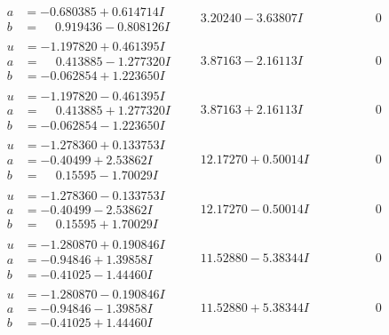 \documentclass[1p]{elsarticle_modified}
\theoremstyle{definition}
\begin{document}
$$\begin{array}{c|c|c}
\begin{aligned}
a &= -0.680385 + 0.614714 I \\
b &= \phantom{-}0.919436 - 0.808126 I\end{aligned}
 & \phantom{-}3.20240 - 3.63807 I & \phantom{-0.000000 } 0 \\ \hline\begin{aligned}
u &= -1.197820 + 0.461395 I \\
a &= \phantom{-}0.413885 - 1.277320 I \\
b &= -0.062854 + 1.223650 I\end{aligned}
 & \phantom{-}3.87163 - 2.16113 I & \phantom{-0.000000 } 0 \\ \hline\begin{aligned}
u &= -1.197820 - 0.461395 I \\
a &= \phantom{-}0.413885 + 1.277320 I \\
b &= -0.062854 - 1.223650 I\end{aligned}
 & \phantom{-}3.87163 + 2.16113 I & \phantom{-0.000000 } 0 \\ \hline\begin{aligned}
u &= -1.278360 + 0.133753 I \\
a &= -0.40499 + 2.53862 I \\
b &= \phantom{-}0.15595 - 1.70029 I\end{aligned}
 & \phantom{-}12.17270 + 0.50014 I & \phantom{-0.000000 } 0 \\ \hline\begin{aligned}
u &= -1.278360 - 0.133753 I \\
a &= -0.40499 - 2.53862 I \\
b &= \phantom{-}0.15595 + 1.70029 I\end{aligned}
 & \phantom{-}12.17270 - 0.50014 I & \phantom{-0.000000 } 0 \\ \hline\begin{aligned}
u &= -1.280870 + 0.190846 I \\
a &= -0.94846 + 1.39858 I \\
b &= -0.41025 - 1.44460 I\end{aligned}
 & \phantom{-}11.52880 - 5.38344 I & \phantom{-0.000000 } 0 \\ \hline\begin{aligned}
u &= -1.280870 - 0.190846 I \\
a &= -0.94846 - 1.39858 I \\
b &= -0.41025 + 1.44460 I\end{aligned}
 & \phantom{-}11.52880 + 5.38344 I & \phantom{-0.000000 } 0 \\ \hline\begin{aligned}

\end{aligned}
\end{array}$$
\end{document}
